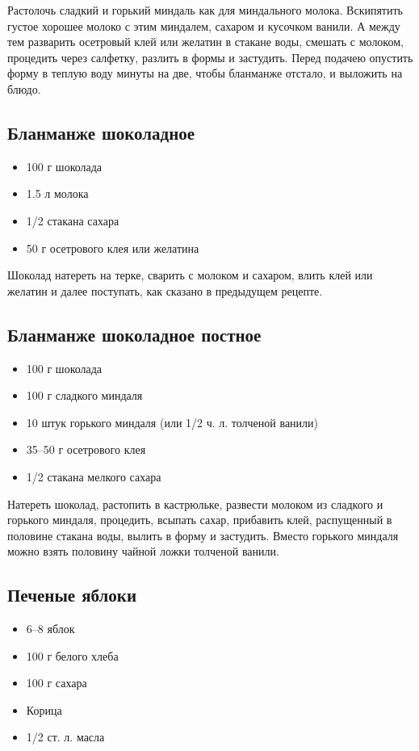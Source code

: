 Растолочь сладкий и горький миндаль как для миндального молока. Вскипятить густое хорошее молоко с этим миндалем, сахаром и кусочком ванили. А между тем разварить осетровый клей или желатин в стакане воды, смешать с молоком, процедить через салфетку, разлить в формы и застудить. Перед подачею опустить форму в теплую воду минуты на две, чтобы бланманже отстало, и выложить на блюдо.

\subsection{Бланманже шоколадное}

\begin{itemize}
	\item 100 г шоколада 
    \item 1.5 л молока 
    \item 1/2 стакана сахара 
    \item 50 г осетрового клея или желатина
\end{itemize}

Шоколад натереть на терке, сварить с молоком и сахаром, влить клей или желатин и далее поступать, как сказано в предыдущем рецепте.

\subsection{Бланманже шоколадное постное}

\begin{itemize}
	\item 100 г шоколада 
    \item 100 г сладкого миндаля 
    \item 10 штук горького миндаля (или 1/2 ч. л. толченой ванили) 
    \item 35–50 г осетрового клея 
    \item 1/2 стакана мелкого сахара
\end{itemize}

Натереть шоколад, растопить в кастрюльке, развести молоком из сладкого и горького миндаля, процедить, всыпать сахар, прибавить клей, распущенный в половине стакана воды, вылить в форму и застудить. Вместо горького миндаля можно взять половину чайной ложки толченой ванили.

\subsection{Печеные яблоки}

\begin{itemize}
	\item 6–8 яблок
    \item 100 г белого хлеба 
    \item 100 г сахара
    \item Корица 
    \item 1/2 ст. л. масла
\end{itemize}

